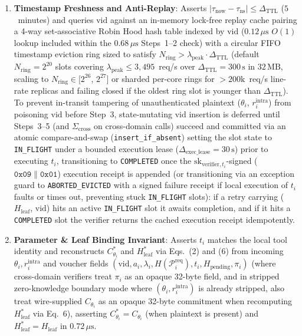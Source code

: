\documentclass[conference,10pt]{IEEEtran}
\begin{document}
{\begin{enumerate}
    \item \textbf{Timestamp Freshness and Anti-Replay}: Asserts $|\tau_{\text{now}} - \tau_{\text{ns}}| \le \Delta_{\text{TTL}}$ ($5$~minutes) and queries $\text{vid}$ against an in-memory lock-free replay cache pairing a 4-way set-associative Robin Hood hash table indexed by $\text{vid}$ ($0.12\,\mu\text{s}$ $O(1)$ lookup included within the $0.68\,\mu\text{s}$ Steps~1--2 check) with a circular FIFO timestamp eviction ring sized to satisfy $N_{\text{ring}} > \lambda_{\text{peak}} \cdot \Delta_{\text{TTL}}$ (default $N_{\text{ring}} = 2^{20}$ slots covering $\lambda_{\text{peak}} \le 3{,}495$~req/s over $\Delta_{\text{TTL}} = 300\,\text{s}$ in $32\,\text{MB}$, scaling to $N_{\text{ring}} \in [2^{26}$, $2^{27}]$ or sharded per-core rings for $> 200\text{k}$~req/s line-rate replicas and failing closed if the oldest ring slot is younger than $\Delta_{\text{TTL}}$). To prevent in-transit tampering of unauthenticated plaintext ($\theta_i$, $r_i^{\text{intra}}$) from poisoning $\text{vid}$ before Step~3, state-mutating $\text{vid}$ insertion is deferred until Steps~3--5 (and $\Sigma_{\text{cross}}$ on cross-domain calls) succeed and committed via an atomic compare-and-swap (\texttt{insert\_\allowbreak if\_\allowbreak absent}) setting the slot state to \texttt{IN\_\allowbreak FLIGHT} under a bounded execution lease ($\Delta_{\text{exec\_lease}} = 30\,\text{s}$) prior to executing $t_i$, transitioning to \texttt{COM\allowbreak PLETED} once the $\text{sk}_{\text{verifier}, t_i}$-\allowbreak signed ($\mathtt{0x09} \parallel \mathtt{0x01}$) execution receipt is appended (or transitioning via an exception guard to \texttt{ABORT\allowbreak ED\_\allowbreak EVICT\allowbreak ED} with a signed failure receipt if local execution of $t_i$ faults or times out, preventing stuck \texttt{IN\_\allowbreak FLIGHT} slots): if a retry carrying ($H_{\text{leaf}}$, $\text{vid}$) hits an active \texttt{IN\_\allowbreak FLIGHT} slot it awaits completion, and if it hits a \texttt{COM\allowbreak PLETED} slot the verifier returns the cached execution receipt idempotently.
    \item \textbf{Parameter \& Leaf Binding Invariant}: Asserts $t_i$ matches the local tool identity and reconstructs $C_{\theta_i}^*$ and $H_{\text{leaf}}^*$ via Eqs.~(2) and (6) from incoming $\theta_i,\allowbreak r_i^{\text{intra}}$ and voucher fields $(\text{vid},\allowbreak a_i,\allowbreak \lambda_i,\allowbreak H(\mathcal{P}_i^{\text{req}}),\allowbreak t_i,\allowbreak H_{\text{pending}},\allowbreak \pi_i)$ (where cross-domain verifiers treat $\pi_i$ as an opaque 32-byte field, and in stripped zero-knowledge boundary mode where $(\theta_i, r_i^{\text{intra}})$ is already stripped, also treat wire-supplied $C_{\theta_i}$ as an opaque 32-byte commitment when recomputing $H_{\text{leaf}}^*$ via Eq.~6), asserting $C_{\theta_i}^* =\allowbreak C_{\theta_i}$ (when plaintext is present) and $H_{\text{leaf}}^* =\allowbreak H_{\text{leaf}}$ in $0.72\,\mu\text{s}$.

\end{enumerate}}
\end{document}
